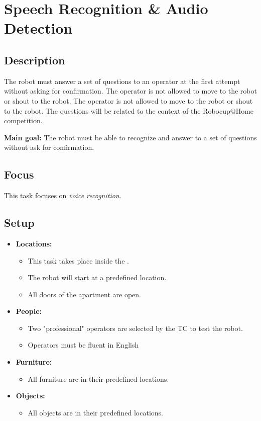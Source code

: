 \section{Speech Recognition \& Audio Detection}
\label{test:speech-recognition-audio-detection}

\subsection*{Description}
The robot must answer a set of questions to an operator at the first attempt without asking for confirmation. The operator is not allowed to move to the robot or shout to the robot. The operator is not allowed to move to the robot or shout to the robot. The questions will be related to the context of the Robocup@Home competition.

\noindent \textbf{Main goal:}
The robot must be able to recognize and answer to a set of questions without ask for confirmation.


\subsection*{Focus}
This task focuses on
\textit{voice recognition}.

\subsection*{Setup}
\begin{itemize}[nosep]	
	\item \textbf{Locations:} 
	\begin{itemize}
		\item This task takes place inside the \Arena{}.
		\item The robot will start at a predefined location.
		\item All doors of the apartment are open.
	\end{itemize}	 
	\item \textbf{People:} 
	\begin{itemize}
		\item Two "professional" operators are selected by the TC to test the robot.
		\item Operators must be fluent in English
	\end{itemize}
	\item \textbf{Furniture:} 
	\begin{itemize}
		\item All furniture are in their predefined locations.
	\end{itemize}
    \item \textbf{Objects:} 
    \begin{itemize}
		\item All objects are in their predefined locations.
	\end{itemize}
\end{itemize}

